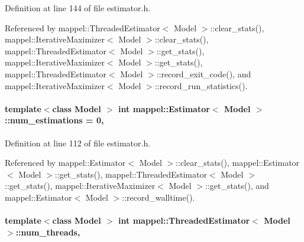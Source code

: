 Definition at line 144 of file estimator.\+h.



Referenced by mappel\+::\+Threaded\+Estimator$<$ Model $>$\+::clear\+\_\+stats(), mappel\+::\+Iterative\+Maximizer$<$ Model $>$\+::clear\+\_\+stats(), mappel\+::\+Threaded\+Estimator$<$ Model $>$\+::get\+\_\+stats(), mappel\+::\+Iterative\+Maximizer$<$ Model $>$\+::get\+\_\+stats(), mappel\+::\+Threaded\+Estimator$<$ Model $>$\+::record\+\_\+exit\+\_\+code(), and mappel\+::\+Iterative\+Maximizer$<$ Model $>$\+::record\+\_\+run\+\_\+statistics().

\paragraph[{\texorpdfstring{num\+\_\+estimations}{num_estimations}}]{\setlength{\rightskip}{0pt plus 5cm}template$<$class Model $>$ int {\bf mappel\+::\+Estimator}$<$ Model $>$\+::num\+\_\+estimations = 0\hspace{0.3cm}{\ttfamily [protected]}, {\ttfamily [inherited]}}\hypertarget{classmappel_1_1Estimator_ab15b88435d6c50a68fac84465d950b12}{}\label{classmappel_1_1Estimator_ab15b88435d6c50a68fac84465d950b12}


Definition at line 112 of file estimator.\+h.



Referenced by mappel\+::\+Estimator$<$ Model $>$\+::clear\+\_\+stats(), mappel\+::\+Estimator$<$ Model $>$\+::get\+\_\+stats(), mappel\+::\+Threaded\+Estimator$<$ Model $>$\+::get\+\_\+stats(), mappel\+::\+Iterative\+Maximizer$<$ Model $>$\+::get\+\_\+stats(), and mappel\+::\+Estimator$<$ Model $>$\+::record\+\_\+walltime().

\paragraph[{\texorpdfstring{num\+\_\+threads}{num_threads}}]{\setlength{\rightskip}{0pt plus 5cm}template$<$class Model $>$ int {\bf mappel\+::\+Threaded\+Estimator}$<$ Model $>$\+::num\+\_\+threads\hspace{0.3cm}{\ttfamily [protected]}, {\ttfamily [inherited]}}\hypertarget{classmappel_1_1ThreadedEstimator_a6afa05d7d971f3317ce1602de853123b}{}\label{classmappel_1_1ThreadedEstimator_a6afa05d7d971f3317ce1602de853123b}


